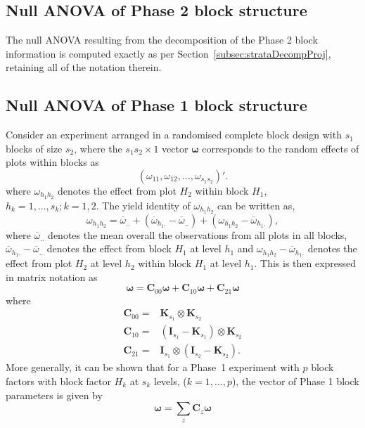 \documentclass[article]{jss}
\newcommand{\I}{\mathbf{I}}
\newcommand{\K}{\mathbf{K}}
\newcommand{\C}{\mathbf{C}}
\begin{document}
\subsection{Null ANOVA of Phase 2 block structure}
The null ANOVA resulting from the decomposition of the Phase 2 block information is computed exactly as per Section~\ref{subsec:strataDecompProj}, retaining all of the notation therein.

\subsection{Null ANOVA of Phase 1 block structure}
Consider an experiment arranged in a randomised complete block design with $s_1$ blocks of size $s_2$, where the $s_1s_2 \times 1$ vector $\bm{\omega}$ corresponds to the random effects of plots within blocks as  
\begin{equation}\label{eq:blockParSplitBlk1}
 (\omega_{11}, \omega_{12}, \dots, \omega_{s_1 s_2})'. 
\end{equation}
where $\omega_{h_1 h_2}$ denotes the effect from plot $H_2$ within block $H_1$, $h_k = 1, \dots, s_k; k = 1, 2$. The yield identity of $\omega_{h_1 h_2}$ can be written as,
\begin{equation}
\label{eq:yieldIdentityNest}
\omega_{h_1 h_2} = \overline{\omega}_{..}+(\overline{\omega}_{h_1 .} -\overline{\omega}_{..}) + (\omega_{h_1 h_2} - \overline{\omega}_{h_1 .}),
\end{equation}
where $\overline{\omega}_{..}$ denotes the mean overall the observations from all plots in all blocks, $\overline{\omega}_{h_1 .} -\overline{\omega}_{..}$ denotes the effect from block $H_1$ at level $h_1$ and $\omega_{h_1 h_2} - \overline{\omega}_{h_1 .}$ denotes the effect from plot $H_2$ at level $h_2$ within block $H_1$ at level $h_1$. This is then expressed in matrix notation as 
\[
\bm{\omega} = \C_{00} \bm{\omega} + \C_{10}\bm{\omega} + \C_{21}\bm{\omega}
\]
where
\begin{eqnarray}
\nonumber \C_{00} = & \K_{s_1} \otimes \K_{s_2}\\
\nonumber \C_{10} = &  (\I_{s_1} - \K_{s_1}) \otimes \K_{s_2} \\
\nonumber \C_{21} = &  \I_{s_1} \otimes (\I_{s_2} - \K_{s_2}).
\end{eqnarray}
More generally, it can be shown that for a Phase~1 experiment with $p$ block factors with block factor $H_k$ at $s_k$ levels, ($k = 1, \dots, p$), the vector of Phase 1 block parameters is given by 
\begin{equation}
\bm{\omega} = \sum_z{\C_{z}\bm{\omega}}
\end{equation}
\end{document}
